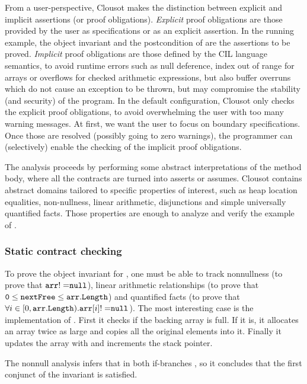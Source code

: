 \documentclass{llncs}
\begin{document}
From a user-perspective, Clousot makes the distinction between
explicit and implicit assertions (or proof obligations).
\emph{Explicit} proof obligations are those provided by the user as
specifications or as an explicit assertion.  In the running example,
the object invariant and the postcondition of  are the
assertions to be proved.  \emph{Implicit} proof obligations are those
defined by the CIL language semantics, to avoid runtime errors such as
null deference, index out of range for arrays or overflows for checked
arithmetic expressions, but also buffer overruns which do not cause an
exception to be thrown, but may compromise the stability (and
security) of the program.  In the default configuration, Clousot only
checks the explicit proof obligations, to avoid overwhelming the user
with too many warning messages.  At first, we want the user to focus
on boundary specifications.  Once those are resolved (possibly going
to zero warnings), the programmer can (selectively) enable the
checking of the implicit proof obligations.

The analysis proceeds by performing some abstract interpretations of the method body, where all the contracts are turned into asserts or assumes.
Clousot contains abstract domains tailored to specific properties of interest, such as heap location equalities, non-nullness, linear arithmetic, disjunctions and simple universally quantified facts.
Those properties are enough to analyze and verify the example of .


\subsubsection{Static contract checking}
To prove the object invariant for , one must be able to track nonnullness (to prove that $\mathtt{arr} \mathtt{!=} \mathtt{null}$), linear arithmetic relationships (to prove that $\mathtt{0} \leq \mathtt{nextFree} \leq \mathtt{arr.Length}$) and quantified facts (to prove that $\forall i \in [0, \mathtt{arr.Length}). \mathtt{arr}[i] \mathtt{!=} \mathtt{null}$).
The most interesting case is the implementation of .
First it checks if the backing array is full.
If it is, it allocates an array twice as large and copies all the original elements into it.
Finally it updates the array with  and increments the stack pointer.

The nonnull analysis infers that in both if-branches  \code{!=} , so it concludes that the first conjunct of the invariant is satisfied.
\end{document}
